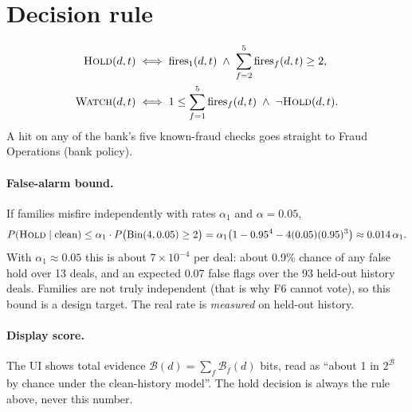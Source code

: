 \documentclass[11pt]{article}
\newcommand{\B}{\mathcal{B}}
\begin{document}
\section{Decision rule}
\begin{align}
\textsc{Hold}(d,t)&\iff \text{fires}_1(d,t)\;\wedge\;\sum_{f=2}^{5}\text{fires}_f(d,t)\ge 2 ,\\
\textsc{Watch}(d,t)&\iff 1\le\sum_{f=1}^{5}\text{fires}_f(d,t)\;\wedge\;\neg\textsc{Hold}(d,t).
\end{align}
A hit on any of the bank's five known-fraud checks goes straight to Fraud Operations (bank policy).

\paragraph{False-alarm bound.} If families misfire independently with rates $\alpha_1$ and $\alpha=0.05$,
\begin{equation}
P(\textsc{Hold}\mid\text{clean})\le \alpha_1\cdot P\big(\mathrm{Bin}(4,0.05)\ge 2\big)
=\alpha_1\big(1-0.95^4-4(0.05)(0.95)^3\big)\approx 0.014\,\alpha_1 .
\end{equation}
With $\alpha_1\approx 0.05$ this is about $7\times10^{-4}$ per deal: about 0.9\% chance of any false hold over 13 deals, and an expected 0.07 false flags over the 93 held-out history deals.
Families are not truly independent (that is why F6 cannot vote), so this bound is a design target. The real rate is \emph{measured} on held-out history.

\paragraph{Display score.} The UI shows total evidence $\B(d)=\sum_f\B_f(d)$ bits, read as ``about 1 in $2^{\B}$ by chance under the clean-history model''. The hold decision is always the rule above, never this number.
\end{document}

